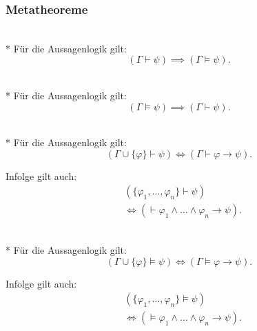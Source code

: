 \subsubsection{Metatheoreme}

\begin{Satz}\mbox{}\\*
Für die Aussagenlogik gilt:
\begin{equation}
(\Gamma\vdash\psi)\implies (\Gamma\models\psi).
\end{equation}
\end{Satz}

\begin{Satz}\mbox{}\\*
Für die Aussagenlogik gilt:
\begin{equation}
(\Gamma\models\psi)\implies (\Gamma\vdash\psi).
\end{equation}
\end{Satz}

\begin{Satz}\mbox{}\\*
Für die Aussagenlogik gilt:
\begin{equation}
(\Gamma\cup\{\varphi\}\vdash\psi)\iff (\Gamma\vdash\varphi\rightarrow\psi).
\end{equation}
\end{Satz}
Infolge gilt auch:
\begin{equation}
\begin{split}
&(\{\varphi_1,\ldots,\varphi_n\}\vdash\psi)\\
&\iff (\vdash \varphi_1\land\ldots\land\varphi_n\rightarrow\psi).
\end{split}
\end{equation}

\begin{Satz}\mbox{}\\*
Für die Aussagenlogik gilt:
\begin{equation}
(\Gamma\cup\{\varphi\}\models\psi)\iff (\Gamma\models\varphi\rightarrow\psi).
\end{equation}
\end{Satz}
Infolge gilt auch:
\begin{equation}
\begin{split}
&(\{\varphi_1,\ldots,\varphi_n\}\models\psi)\\
&\iff (\models \varphi_1\land\ldots\land\varphi_n\rightarrow\psi).
\end{split}
\end{equation}

